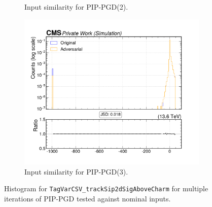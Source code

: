 \begin{figure}[htbp]
\begin{subfigure}[t]{0.32\textwidth}
    \caption*{Input similarity for PIP-PGD(2).}
  \end{subfigure}\hfill
  \begin{subfigure}[t]{0.32\textwidth}
    \includegraphics[width=\linewidth]{media/output/features/compare/combined_it_3/cmp_global_features_TagVarCSV_trackSip2dSigAboveCharm.pdf}
    \caption*{Input similarity for PIP-PGD(3).}
  \end{subfigure}

  \caption*{Histogram for \texttt{TagVarCSV\_trackSip2dSigAboveCharm} for multiple iterations of PIP-PGD tested against nominal inputs.}
  \label{fig:combined_input_TagVarCSV_trackSip2dSigAboveCharm}
\end{figure}

